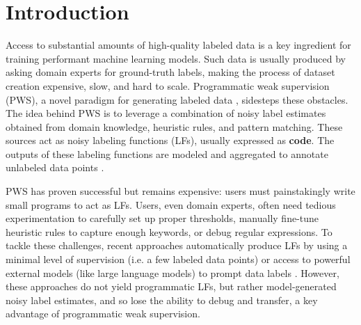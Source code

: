 \section{Introduction}


Access to substantial amounts of high-quality labeled data is a key ingredient for training performant machine learning models. Such data is usually produced by asking domain experts for ground-truth labels, making the process of dataset creation expensive, slow, and hard to scale. Programmatic weak supervision (PWS), a novel paradigm for generating labeled data \cite{ratner2016data}, sidesteps these obstacles. The idea behind PWS is to leverage a combination of noisy label estimates obtained from domain knowledge, heuristic rules, and pattern matching. These sources act as noisy labeling functions (LFs), usually expressed as \textbf{code}. The outputs of these labeling functions are modeled and aggregated to annotate unlabeled data points \cite{ratner2016data, ratner2017snorkel, ratner2019training, fu2020fast}. 

PWS has proven successful \cite{bach2019snorkel, evensen2020ruler, li2021weakly, gao2022classifying} but remains expensive: users must painstakingly write small programs to act as LFs. Users, even domain experts, often need tedious experimentation to carefully set up proper thresholds, manually fine-tune heuristic rules to capture enough keywords, or debug regular expressions. %
%
To tackle these challenges, recent approaches automatically produce %
LFs by using a minimal level of supervision (i.e. a few labeled data points) \cite{varma2018snuba, das2020goggles, inproceedings, boecking2021interactive, roberts2022autowsbench} or access to powerful external models (like large language models) to prompt data labels \cite{smith2022language}. However, these approaches do not yield programmatic LFs, but rather model-generated noisy label estimates, and so lose the ability to debug and transfer, a key advantage of programmatic weak supervision.

